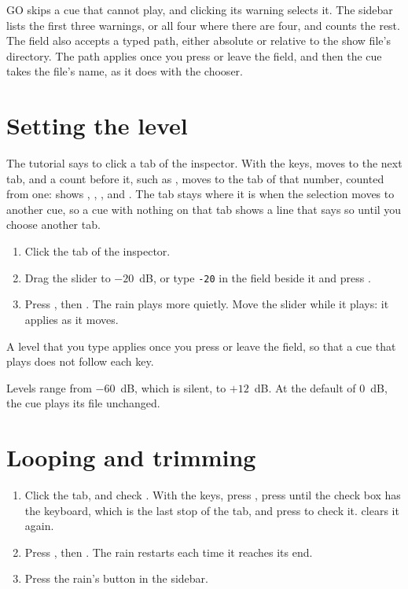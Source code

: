 GO skips a cue that cannot play, and clicking its warning selects it.  The
sidebar lists the first three warnings, or all four where there are four, and
counts the rest.  The  field also accepts a typed path, either
absolute or relative to the show file's directory.  The path applies once you
press  or leave the field, and then the cue takes the file's name,
as it does with the chooser.

\section{Setting the level}

The tutorial says to click a tab of the inspector.  With the keys, 
moves to the next tab, and a count before it, such as , moves to the
tab of that number, counted from one:  shows , 
,  , and  \@.
The tab stays where it is when the selection moves to another cue, so a cue
with nothing on that tab shows a line that says so until you choose another
tab.

\begin{enumerate}
\item Click the  tab of the inspector.
\item Drag the slider to $-20$~dB, or type \texttt{-20} in the field beside
  it and press \@.
\item Press , then \@.  The rain plays more
  quietly.  Move the slider while it plays: it applies as it moves.
\end{enumerate}

A level that you type applies once you press  or leave the field,
so that a cue that plays does not follow each key.

Levels range from $-60$~dB, which is silent, to $+12$~dB\@.  At the default
of 0~dB, the cue plays its file unchanged.

\section{Looping and trimming}

\begin{enumerate}
\item Click the  tab, and check .  With the keys, press , press  until the check
  box has the keyboard, which is the last stop of the tab, and press
   to check it.   clears it again.
\item Press , then \@.  The rain restarts each
  time it reaches its end.
\item Press the rain's  button in the sidebar.
\end{enumerate}

